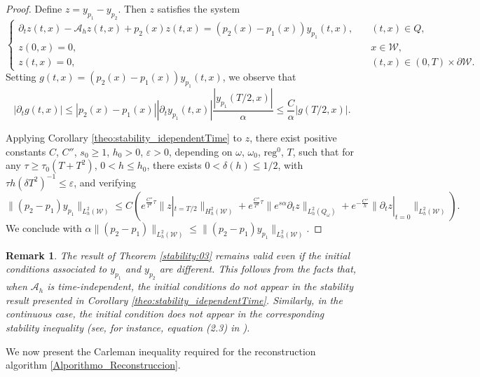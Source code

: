 \documentclass{amsart}
\numberwithin{equation}{section}
\newtheorem{remark}[theorem]{Remark}
\begin{document}
\begin{proof}
     Define $z=y_{p_1}-y_{p_2}$. Then $z$ satisfies the system
    \begin{equation*}
        \begin{cases}
            \partial_{t}z(t,x)-\mathcal{A}_{h}z(t,x)+p_2(x)z(t,x)=(p_2(x)-p_1(x))y_{p_1}(t,x),\quad &(t,x)\in Q,\\
            z(0,x)=0, &x\in\mathcal{W},\\
            z(t,x)=0, &(t,x)\in(0,T)\times\partial\mathcal{W}.
        \end{cases}
    \end{equation*}
    Setting $g(t,x)=(p_2(x)-p_1(x))y_{p_1}(t,x)$, we observe that $$|\partial_t g(t,x)|\leq |p_2(x)-p_1(x)| |\partial_t y_{p_1}(t,x)|\frac{|y_{p_1}(T/2,x)|}{\alpha}\leq \frac{C}{\alpha}|g(T/2,x)|.$$
    
    Applying Corollary \ref{theo:stability_idependentTime} to $z$, there exist positive constants $C$, $C''$,  $s_{0}\geq 1$, $h_{0}>0$, $\varepsilon >0$, depending on $\omega$, $\omega_{0}$, $\mbox{reg}^{0}$, $T$, such that for any $\tau\geq \tau_{0}(T+T^{2})$, $0<h\leq h_{0}$, there exists $0<\delta(h)\leq 1/2$, with $\tau h(\delta T^{2})^{-1}\leq \varepsilon$, and verifying
\begin{equation*}
    \| (p_2-p_1)y_{p_1}\|_{L_h^2(\mathcal{W})}\leq C\left(e^{\frac{C''}{T^2}\tau}\|z|_{t=T/2}\|_{H_h^2(\mathcal{W})}+e^{\frac{C''}{T^2}\tau}\|e^{s\alpha}\partial_{t}z\|_{L_h^2(Q_\omega)}
    +e^{-\frac{C''}{h}}\|\partial_{t}z|_{t=0}\|_{L^2_h(\mathcal{W})}\right).
\end{equation*} 
We conclude with $\alpha \| (p_2-p_1)\|_{L_h^2(\mathcal{W})}\leq \| (p_2-p_1)y_{p_1}\|_{L_h^2(\mathcal{W})}$.
\end{proof}
\begin{remark}
The result of Theorem \ref{stability:03} remains valid even if the initial conditions associated to $y_{p_1}$ and $y_{p_2}$ are different. This follows from the facts that, when $\mathcal{A}_h$ is time-independent, the initial conditions do not appear in the stability result presented in Corollary \ref{theo:stability_idependentTime}. Similarly, in the continuous case, the initial condition does not appear in the corresponding stability inequality (see, for instance, equation (2.3) in \cite{Yamamoto_2001}).
\end{remark}
We now present the Carleman inequality required for the reconstruction algorithm \eqref{Alporithmo_Reconstruccion}.
\end{document}
